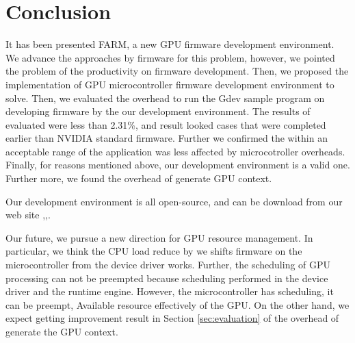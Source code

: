
\section{Conclusion}\label{sec:con}
It has been presented FARM, a new GPU firmware development environment.
We advance the approaches by firmware for this problem, 
however, we pointed the problem of the productivity on firmware development.
Then, we proposed the implementation of GPU microcontroller firmware development environment to solve.
Then, we evaluated the overhead to run the Gdev sample program on developing firmware by the our development environment.
The results of evaluated were less than 2.31\%, and result looked cases that were completed earlier than NVIDIA standard firmware. Further we confirmed the within an acceptable range of the application was less affected by microcotroller overheads.
Finally, for reasons mentioned above, our development environment is a valid one.
Further more, we found the overhead of generate GPU context.
\par
Our development environment is all open-source, and can be download from our web site \cite{yukke:farm},\cite{yukke:nvfc},\cite{kato:gdev}.
\par
Our future, we pursue a new direction for GPU resource management.
In particular, we think the CPU load reduce by we shifts firmware on the microcontroller from the device driver works.
Further, the scheduling of GPU processing can not be preempted because scheduling performed in the device driver and the runtime engine.
However, the microcontroller has scheduling, it can be preempt, Available resource effectively of the GPU.
On the other hand, we expect getting improvement result in Section \ref{sec:evaluation} of the overhead of generate the GPU context.
